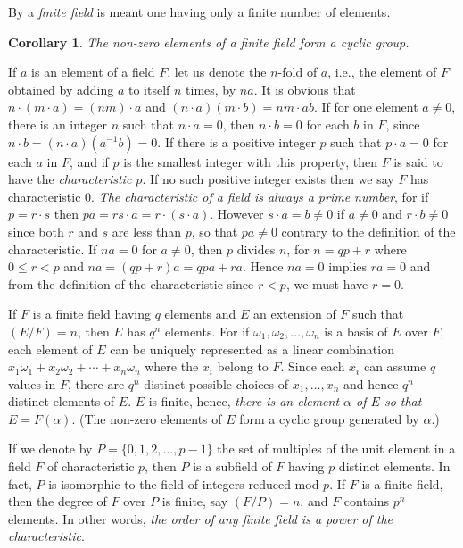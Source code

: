 \documentclass[10pt,leqno,a5paper]{book}
\newtheorem*{coro*}{Corollary}
\theoremstyle{definition}
\begin{document}
By a \emph{finite field} is meant one having only a finite number of elements.


\begin{coro*}
\label{coro:p53}
The non-zero elements of a finite field form a cyclic group.
\end{coro*}


If $a$ is an element of a field $F$, let us denote the $n$-fold of $a$, i.e., the element of $F$ obtained by adding $a$ to itself $n$ times, by $na$.
It is obvious that $n\cdot(m\cdot a) = (nm) \cdot a$ and $(n \cdot a) (m \cdot b) = nm \cdot ab$.
If for one element $a \not= 0$, there is an integer $n$ such that $n \cdot a = 0$, then $n \cdot b = 0$ for each $b$ in $F$, since $n \cdot b = (n \cdot a)(a^{-1}b) = 0$.
If there is a positive integer $p$ such that $p \cdot a = 0$ for each $a$ in $F$, and if $p$ is the smallest integer with this property, then $F$ is said to have the \emph{characteristic $p$}.
If no such positive integer exists then we say $F$ has characteristic $0$.
\emph{The characteristic of a field is always a prime number}, for if $p = r \cdot s$ then $pa = rs \cdot a = r \cdot (s \cdot a)$.
However $s \cdot a = b \not= 0$ if $a \not= 0$ and $r \cdot b \not= 0$ since both $r$ and $s$ are less than $p$, so that $pa \not= 0$ contrary to the definition of the characteristic.
If $na = 0$ for $a \not= 0$, then $p$ divides $n$, for $n = qp + r$ where $0 \leq r < p$ and $na = (qp + r)a = qpa + ra$.
Hence $na = 0$ implies $ra = 0$ and from the definition of the characteristic since $r < p$, we must have $r = 0$.

If $F$ is a finite field having $q$ elements and $E$ an extension of $F$ such that $(E/F) = n$, then $E$ has $q^n$ elements.
For if $\omega_1, \omega_2, \ldots, \omega_n$ is a basis of $E$ over $F$, each element of $E$ can be uniquely represented as a linear combination $x_1 \omega_1 + x_2 \omega_2 + \cdots + x_n \omega_n$ where the $x_i$ belong to $F$.
Since each $x_i$ can assume $q$ values in $F$, there are $q^n$ distinct possible choices of $x_1,\ldots,x_n$ and hence $q^n$ distinct elements of $E$.
$E$ is finite, hence, \emph{there is an element $\alpha$ of $E$ so that $E = F(\alpha)$}.
(The non-zero elements of $E$ form a cyclic group generated by $\alpha$.)

If we denote by $P = \{0,1,2,\ldots,p-1\}$ the set of multiples of the unit element in a field $F$ of characteristic $p$, then $P$ is a subfield of $F$ having $p$ distinct elements.
In fact, $P$ is isomorphic to the field of integers reduced mod $p$.
If $F$ is a finite field, then the degree of $F$ over $P$ is finite, say $(F/P) = n$, and $F$ contains $p^n$ elements.
In other words, \emph{the order of any finite field is a power of the characteristic}.
\end{document}
